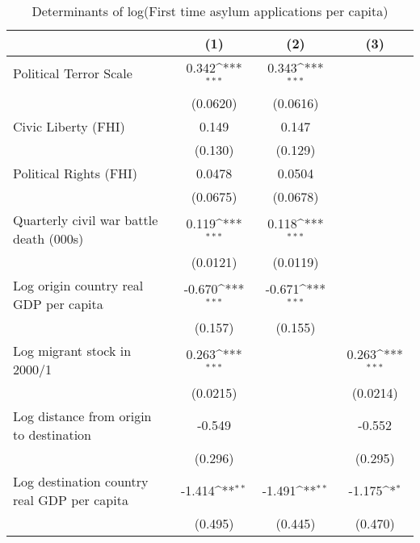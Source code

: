 \begin{table}[htbp]\centering
\def\sym#1{\ifmmode^{#1}\else\(^{#1}\)\fi}
\caption{Determinants of log(First time asylum applications per capita)}
\begin{tabular}{l*{3}{c}}
\hline\hline
                    &\multicolumn{1}{c}{(1)}         &\multicolumn{1}{c}{(2)}         &\multicolumn{1}{c}{(3)}         \\
\hline
Political Terror Scale&       0.342\sym{***}&       0.343\sym{***}&                     \\
                    &    (0.0620)         &    (0.0616)         &                     \\
[1em]
Civic Liberty (FHI) &       0.149         &       0.147         &                     \\
                    &     (0.130)         &     (0.129)         &                     \\
[1em]
Political Rights (FHI)&      0.0478         &      0.0504         &                     \\
                    &    (0.0675)         &    (0.0678)         &                     \\
[1em]
Quarterly civil war battle death (000s)&       0.119\sym{***}&       0.118\sym{***}&                     \\
                    &    (0.0121)         &    (0.0119)         &                     \\
[1em]
Log origin country real GDP per capita&      -0.670\sym{***}&      -0.671\sym{***}&                     \\
                    &     (0.157)         &     (0.155)         &                     \\
[1em]
Log migrant stock in 2000/1&       0.263\sym{***}&                     &       0.263\sym{***}\\
                    &    (0.0215)         &                     &    (0.0214)         \\
[1em]
Log distance from origin to destination&      -0.549         &                     &      -0.552         \\
                    &     (0.296)         &                     &     (0.295)         \\
[1em]
Log destination country real GDP per capita&      -1.414\sym{**} &      -1.491\sym{**} &      -1.175\sym{*}  \\
                    &     (0.495)         &     (0.445)         &     (0.470)         \\

\end{tabular}
\end{table}
